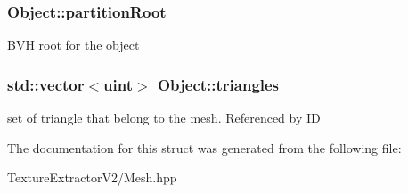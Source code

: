 \subsubsection[{partition\+Root}]{ Object\+::partition\+Root}\label{struct_object_a484e6471a6620c2dd98aa3db6ab7a9f5}
B\+V\+H root for the object \hypertarget{struct_object_a4a7a34b417ea8969e1407e6962c671eb}{}
\subsubsection[{triangles}]{\setlength{\rightskip}{0pt plus 5cm}std\+::vector$<$uint$>$ Object\+::triangles}\label{struct_object_a4a7a34b417ea8969e1407e6962c671eb}
set of triangle that belong to the mesh. Referenced by I\+D 

The documentation for this struct was generated from the following file\+:\begin{DoxyCompactItemize}
\item 
Texture\+Extractor\+V2/Mesh.\+hpp\end{DoxyCompactItemize}
